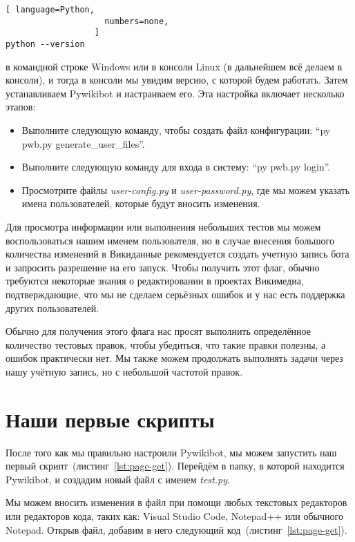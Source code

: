 \begin{lstlisting}[ language=Python,
                    numbers=none,
                  ]
python --version
\end{lstlisting}
в командной строке Windows или в консоли Linux (в дальнейшем всё делаем в консоли), и тогда в консоли мы увидим версию, с которой будем работать. Затем устанавливаем Pywikibot и настраиваем его. Эта настройка включает несколько этапов:

\begin{itemize}
  \setlength{\itemindent}{2em}
  \item Выполните следующую команду, чтобы создать файл конфигурации: ``py pwb.py generate\_user\_files''.
  \item Выполните следующую команду для входа в систему: ``py pwb.py login''.
  \item Просмотрите файлы \textit{user-config.py} и \textit{user-password.py}, где мы можем указать имена пользователей, которые будут вносить изменения.
\end{itemize}

Для просмотра информации или выполнения небольших тестов мы можем воспользоваться нашим именем пользователя, но в случае внесения большого количества изменений в Викиданные рекомендуется создать учетную запись бота и запросить разрешение на его запуск. Чтобы получить этот флаг, обычно требуются некоторые знания о редактировании в проектах Викимедиа, подтверждающие, что мы не сделаем серьёзных ошибок и у нас есть поддержка других пользователей.

Обычно для получения этого флага нас просят выполнить определённое количество тестовых правок, чтобы убедиться, что такие правки полезны, а ошибок практически нет. Мы также можем продолжать выполнять задачи через нашу учётную запись, но с небольшой частотой правок.

\section{Наши первые скрипты}
\label{sec:firstScript}
После того как мы правильно настроили Pywikibot, мы можем запустить 
наш первый скрипт~(листинг~\ref{lst:page-get}). 
Перейдём в папку, в которой находится Pywikibot, и создадим новый файл с именем \textit{test.py}.

Мы можем вносить изменения в файл при помощи любых текстовых редакторов 
или редакторов кода, таких как: 
Visual Studio Code, Notepad++ или обычного Notepad. 
Открыв файл, добавим в него следующий код~(листинг~\ref{lst:page-get}).

